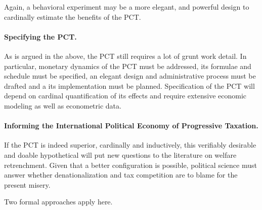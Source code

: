 Again, a behavioral experiment may be a more elegant, and powerful design to cardinally estimate the benefits of the PCT.

\paragraph{Specifying the PCT.} As is argued in the above, the PCT still requires a lot of grunt work detail.
In particular, monetary dynamics of the PCT must be addressed, its formulae and schedule must be specified, an elegant design and administrative process must be drafted and a its implementation must be planned.
Specification of the PCT will depend on cardinal quantification of its effects and require extensive economic modeling as well as econometric data.

\paragraph{Informing the International Political Economy of Progressive Taxation.} If the PCT is indeed superior, cardinally and inductively, this verifiably desirable and doable hypothetical will put new questions to the literature on welfare retrenchment.
Given that a better configuration is possible, political science must answer whether denationalization and tax competition are to blame for the present misery.

Two formal approaches apply here.

